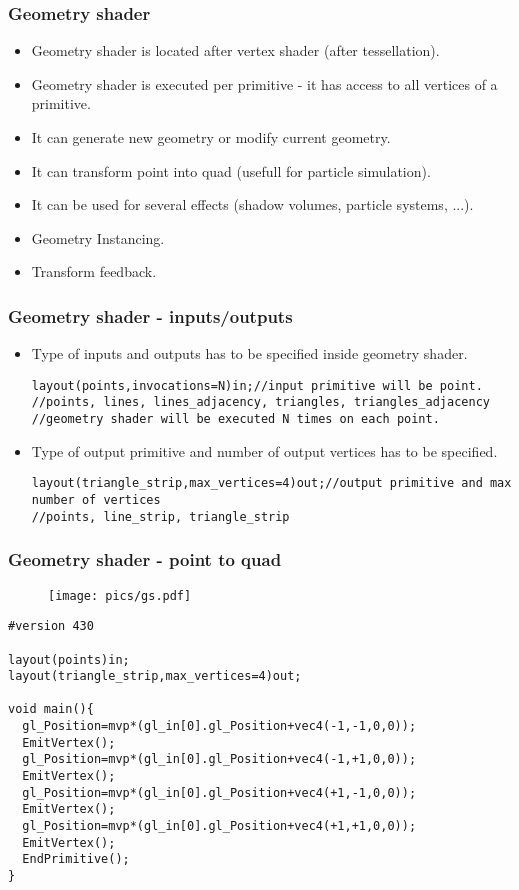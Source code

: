 
\begin{frame}[fragile]
\frametitle{Geometry shader}
	\begin{itemize}
  \item Geometry shader is located after vertex shader (after tessellation).
	\item Geometry shader is executed per primitive - it has access to all vertices of a primitive.
	\item It can generate new geometry or modify current geometry.
  \item It can transform point into quad (usefull for particle simulation).
  \item It can be used for several effects (shadow volumes, particle systems, ...).
	\item Geometry Instancing.
	\item Transform feedback.
	\end{itemize}
\end{frame}

\begin{frame}[fragile]
\frametitle{Geometry shader - inputs/outputs}
	\begin{itemize}
	\item Type of inputs and outputs has to be specified inside geometry shader.
{\scriptsize
\begin{verbatim}
layout(points,invocations=N)in;//input primitive will be point.
//points, lines, lines_adjacency, triangles, triangles_adjacency
//geometry shader will be executed N times on each point.
\end{verbatim}
}
	\item Type of output primitive and number of output vertices has to be specified.
{\scriptsize
\begin{verbatim}
layout(triangle_strip,max_vertices=4)out;//output primitive and max number of vertices
//points, line_strip, triangle_strip
\end{verbatim}
}
	\end{itemize}
\end{frame}

\begin{frame}[fragile]
\frametitle{Geometry shader - point to quad}
	\begin{figure}[h]
		\texttt{[image: pics/gs.pdf]}
	\end{figure}

{\scriptsize
\begin{verbatim}
#version 430

layout(points)in;
layout(triangle_strip,max_vertices=4)out;

void main(){
  gl_Position=mvp*(gl_in[0].gl_Position+vec4(-1,-1,0,0));
  EmitVertex();
  gl_Position=mvp*(gl_in[0].gl_Position+vec4(-1,+1,0,0));
  EmitVertex();
  gl_Position=mvp*(gl_in[0].gl_Position+vec4(+1,-1,0,0));
  EmitVertex();
  gl_Position=mvp*(gl_in[0].gl_Position+vec4(+1,+1,0,0));
  EmitVertex();
  EndPrimitive();
}
\end{verbatim}
}
\end{frame}

